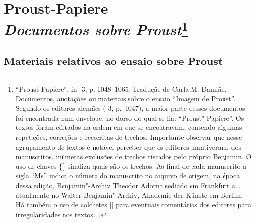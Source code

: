 
\chapter*{Proust-Papiere\\ \emph{Documentos sobre Proust}\footnote[*]{``Proust-Papiere'', in -3, p. 1048--1065. Tradução de Carla M. Damião. Documentos, anotações ou materiais sobre o ensaio ``Imagem de Proust''. Segundo os editores alemães (-3, p.~1047), a maior parte desses documentos foi encontrada num envelope, no dorso do qual se lia: ``Proust"-Papiere''. Os textos foram editados na ordem em que se encontravam, contendo algumas repetições, correções e reescritas de trechos. Importante observar que nesse agrupamento de textos é notável perceber que os editores mantiveram, dos manuscritos, inúmeras exclusões de trechos riscados pelo próprio Benjamin. O uso de chaves \{\} sinaliza quais são os trechos. Ao final de cada manuscrito a sigla ``Ms'' indica o número do manuscrito no arquivo de origem, na época dessa edição, Benjamin"-Archiv Theodor Adorno sediado em Frankfurt a.\,. atualmente no Walter Benjamin"-Archiv, Akademie der Künste em Berlim. Há também o uso de colchetes [] para eventuais comentários dos editores para irregularidades nos textos. []}}

\section{Materiais relativos ao ensaio sobre Proust}


